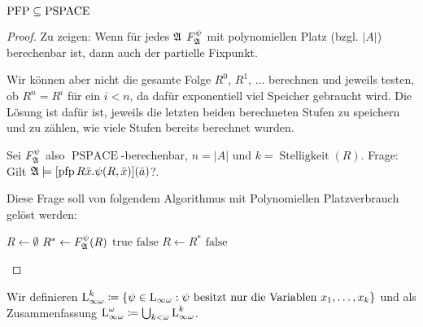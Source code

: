 \begin{satz}
	$\operatorname{PFP}\subseteq \operatorname{PSPACE}$
\end{satz}
\begin{proof}
	Zu zeigen: Wenn für jedes $\mathfrak{A}$ $F^\psi_{\mathfrak{A}}$ mit polynomiellen Platz (bzgl. $\vert A\vert$) berechenbar ist, dann auch der partielle Fixpunkt.
	
	Wir können aber nicht die gesamte Folge $R^0$, $R^1$, $\dots$ berechnen und jeweils testen, ob $R^n=R^i$ für ein $i<n$, da dafür exponentiell viel Speicher gebraucht wird. Die Lösung ist dafür ist, jeweils die letzten beiden berechneten Stufen zu speichern und zu zählen, wie viele Stufen bereits berechnet wurden.
	
	Sei $F^\psi_{\mathfrak{A}}$ also $\operatorname{PSPACE}$-berechenbar, $n=\vert A \vert$ und $k=\operatorname{Stelligkeit}(R)$. Frage: Gilt $\mathfrak{A}\models [\operatorname{pfp} R\bar{x} . \psi(R,\bar{x})](\bar{a})$?.
	
	Diese Frage soll von folgendem Algorithmus mit Polynomiellen Platzverbrauch gelöst werden:
	\begin{algorithmic}
		\State $R \gets \emptyset$
			\State $R^\ast \gets F^\psi_{\mathfrak{A}}(R)$
					\State \Return $\text{true}$
				\Else
					\State \Return $\text{false}$
				\EndIf
			\Else
				\State $R \gets R^\ast$
			\EndIf
		\EndFor
		\State \Return $\text{false}$
	\end{algorithmic}
\end{proof}

\begin{definition}
	Wir definieren $\operatorname{L}_{\infty\omega}^k\coloneqq\{\psi \in \operatorname{L}_{\infty\omega} : \psi \text{ besitzt nur die Variablen } x_1,\dots,x_k\}$ und als Zusammenfassung $\operatorname{L}_{\infty\omega}^\omega\coloneqq \bigcup_{k<\omega} \operatorname{L}_{\infty\omega}^k$.
\end{definition}

